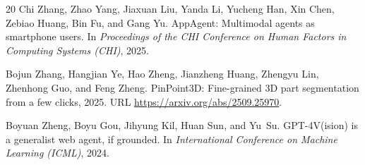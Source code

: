 \documentclass{article}
\begin{document}
\begin{thebibliography}{20}
Chi Zhang, Zhao Yang, Jiaxuan Liu, Yanda Li, Yucheng Han, Xin Chen, Zebiao Huang, Bin Fu, and Gang Yu.
\newblock AppAgent: Multimodal agents as smartphone users.
\newblock In \emph{Proceedings of the CHI Conference on Human Factors in Computing Systems (CHI)}, 2025.

Bojun Zhang, Hangjian Ye, Hao Zheng, Jianzheng Huang, Zhengyu Lin, Zhenhong Guo, and Feng Zheng.
\newblock PinPoint3D: Fine-grained 3D part segmentation from a few clicks, 2025.
\newblock URL \url{https://arxiv.org/abs/2509.25970}.

Boyuan Zheng, Boyu Gou, Jihyung Kil, Huan Sun, and Yu~Su.
\newblock GPT-4V(ision) is a generalist web agent, if grounded.
\newblock In \emph{International Conference on Machine Learning (ICML)}, 2024.

\end{thebibliography}
\end{document}
